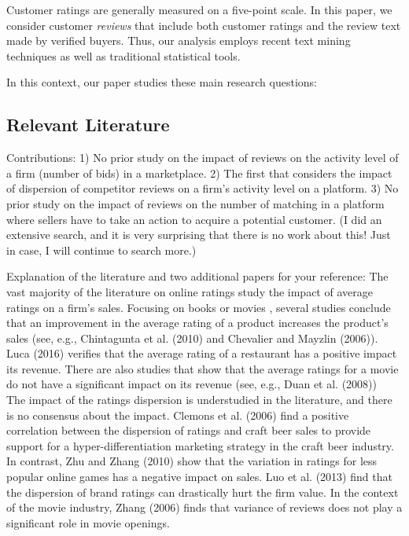 \documentclass[msom,blindrev]{informs3}
\begin{document}
Customer ratings are generally measured on a five-point scale. In this paper, we consider customer \emph{reviews} that include both customer ratings and the review text made by verified buyers. Thus, our analysis employs recent text mining techniques as well as traditional statistical tools.






In this context, our paper studies these main research questions: 

\subsection{Relevant Literature}

Contributions:
1) No prior study on the impact of reviews on the activity level of a firm (number of bids) in a marketplace.
2) The first that considers the impact of dispersion of competitor reviews on a firm’s activity level on a platform.
3) No prior study on the impact of reviews on the number of matching in a platform where sellers have to take an action to acquire a potential customer. (I did an extensive search, and it is very surprising that there is no work about this! Just in case, I will continue to search more.)

Explanation of the literature and two additional papers for your reference:
The vast majority of the literature on online ratings study the impact of average ratings on a firm's sales. Focusing on books or movies , several studies conclude that an improvement in the average rating of a product increases the product’s sales (see, e.g., Chintagunta et al. (2010) and Chevalier and Mayzlin (2006)). Luca (2016) verifies that the average rating of a restaurant has a positive impact its revenue.  There are also studies that show that the average ratings for a movie do not have a significant impact on its revenue (see, e.g., Duan et al. (2008))
 
The impact of the ratings dispersion is understudied in the literature, and there is no consensus about the impact. Clemons et al. (2006) find a positive correlation between the dispersion of ratings and craft beer sales to provide support for a hyper-differentiation marketing strategy in the craft beer industry. In contrast, Zhu and Zhang (2010) show that the variation in ratings for less popular online games has a negative impact on sales.  Luo et al. (2013) find that the dispersion of brand ratings can drastically hurt the firm value. In the context of the movie industry, Zhang (2006) finds that variance of reviews does not play a significant role in movie openings.
\end{document}
